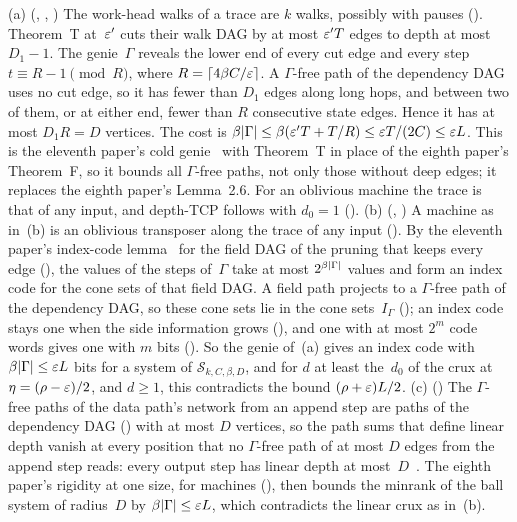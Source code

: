 \begin{outline}
(a) (, , ) The work-head walks of a trace are $k$ walks, possibly with pauses
(). Theorem~T at~$\varepsilon'$ cuts their walk DAG by at most $\varepsilon'T$ edges to depth at most
$D_1-1$. The genie~$\Gamma$ reveals the lower end of every cut edge and every step $t\equiv R-1\pmod R$, where
$R=\lceil4\beta C/\varepsilon\rceil$. A $\Gamma$-free path of the dependency DAG uses no cut edge, so it has fewer than $D_1$ edges along
long hops, and between two of them, or at either end, fewer than $R$ consecutive state edges. Hence it has at most $D_1R=D$
vertices. The cost is $\beta\lvert \Gamma \rvert\le\beta(\varepsilon'T+T/R)\le\varepsilon T/(2C)\le\varepsilon L$. This is the eleventh paper's cold
genie~\cite[Lemma~3.1]{MergeDepth2026} with Theorem~T in place of the eighth paper's Theorem~F, so it bounds all $\Gamma$-free
paths, not only those without deep edges; it replaces the eighth paper's Lemma~2.6. For an oblivious machine the trace is that
of any input, and depth-TCP follows with $d_0=1$ (). (b) (, ) A machine as in~(b) is an oblivious transposer
along the trace of any input (). By the eleventh paper's index-code
lemma~\cite[Lemma~3.3(b)]{MergeDepth2026} for the field DAG of the pruning that keeps every edge
(), the values of the steps of~$\Gamma$ take at most $2^{\beta\lvert \Gamma \rvert}$ values and
form an index code for the cone sets of that field DAG. A field path projects to a $\Gamma$-free path of the dependency DAG, so
these cone sets lie in the cone sets~$I_\Gamma$ (); an index code stays one when the side information
grows (), and one with at most $2^m$ code words gives one with $m$ bits (). So the
genie of~(a) gives an index code with $\beta\lvert \Gamma \rvert\le\varepsilon L$ bits for a system of $\mathcal S_{k,C,\beta,D}$, and for $d$ at
least the~$d_0$ of the crux at $\eta=(\rho-\varepsilon)/2$, and $d\ge1$, this contradicts the bound $(\rho+\varepsilon)L/2$. (c)
() The $\Gamma$-free paths of the data path's network from an append step are paths of the dependency DAG
() with at most $D$ vertices, so the path sums that define linear depth vanish at every
position that no $\Gamma$-free path of at most $D$ edges from the append step reads: every output step has linear depth at
most~$D$~\cite[Definition~7.2]{EighthPaper2026}. The eighth paper's rigidity at one size, for machines
(), then bounds the minrank of the ball system of radius~$D$ by
$\beta\lvert \Gamma \rvert\le\varepsilon L$, which contradicts the linear crux as in~(b).
\end{outline}

